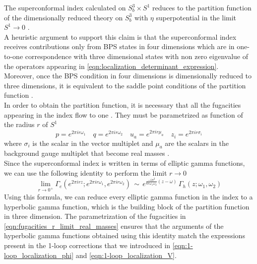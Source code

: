 The superconformal index calculated on $S_b^3 \times S^1$ reduces to the partition function of the dimensionally reduced theory on $S_b^3$ with $\eta$ superpotential in the limit $S^1 \rightarrow 0$  \cite{Gadde:2011ia} \cite{Dolan:2011rp}.\\
A heuristic argument to support this claim is that the superconformal index receives contributions only from BPS states in four dimensions which are in one-to-one correspondence with three dimensional states with non zero eigenvalue of the operators appearing in \eqref{eqn:localization_determinant_expression}.\\
Moreover, once the BPS condition in four dimensions is dimensionally reduced to three dimensions, it is equivalent to the saddle point conditions of the partition function \cite{Agarwal:2012hs}.\\
In order to obtain the partition function, it is necessary that all the fugacities appearing in the index flow to one \cite{Dolan:2011rp}.
They must be parametrized as function of the radius $r$ of $S^1$
\begin{equation}
p= e^{2 \pi i r \omega_1} \quad q=e^{2 \pi i r \omega_2} \quad u_a = e^{2 \pi i r \mu_a } \quad z_i = e^{2 \pi i r \sigma_i}
\label{eqn:fugacities_r_limit_real_masses}
\end{equation}
where $\sigma_i$ is the scalar in the vector multiplet and $\mu_a$ are the scalars in the background gauge multiplet that become real masses .
\\
Since the superconformal index is written in terms of elliptic gamma functions, we can use the following identity \cite{vanDeBult:2007} to perform the limit $r \rightarrow 0$ 
\begin{equation}
\lim_{r \rightarrow 0^+} \Gamma_e (e^{ 2 \pi i r z}; e^{ 2 \pi i  r \omega_1} , e^{ 2 \pi i r  \omega_2}) \,  \sim \,
 e^{\frac{ - i \pi^2 }{6  r \omega_1 \omega_2 } ( z - \omega)} 
 \,
 \Gamma_h ( z ; \omega_1 , \omega_2 )
 \label{eqn:elliptic_to_hyperbolic_vdbult}
\end{equation}
Using this formula, we can reduce every elliptic gamma function in the index to a hyperbolic gamma function, which is the building block of the partition function in three dimension.
The parametrization of the fugacities in \eqref{eqn:fugacities_r_limit_real_masses} ensures that the arguments of the hyperbolic gamma functions obtained using this identity match the expressions present in the 1-loop corrections \cite{Dolan:2011rp} that we introduced in \eqref{eqn:1-loop_localization_phi} and \eqref{eqn:1-loop_localization_V}.\\
